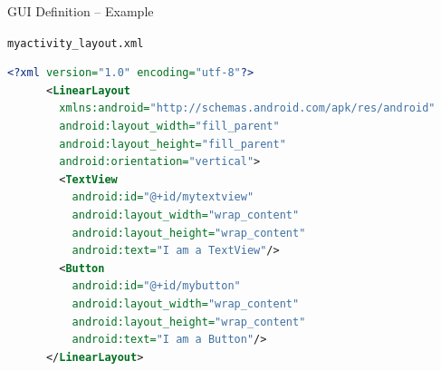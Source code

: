 \documentclass{beamer}
\begin{document}
  \begin{frame}[fragile]{GUI Definition -- Example}
    \begin{exampleblock}{\texttt{myactivity\_layout.xml}}
      \begin{lstlisting}[language=XML]  		        
      <?xml version="1.0" encoding="utf-8"?>
      <LinearLayout 
        xmlns:android="http://schemas.android.com/apk/res/android"
        android:layout_width="fill_parent" 
        android:layout_height="fill_parent"
        android:orientation="vertical">
        <TextView 
          android:id="@+id/mytextview"
          android:layout_width="wrap_content"
          android:layout_height="wrap_content"
          android:text="I am a TextView"/>
        <Button
          android:id="@+id/mybutton"
          android:layout_width="wrap_content"
          android:layout_height="wrap_content"
          android:text="I am a Button"/>
      </LinearLayout>
      \end{lstlisting}
    \end{exampleblock}
  \end{frame}
\end{document}
